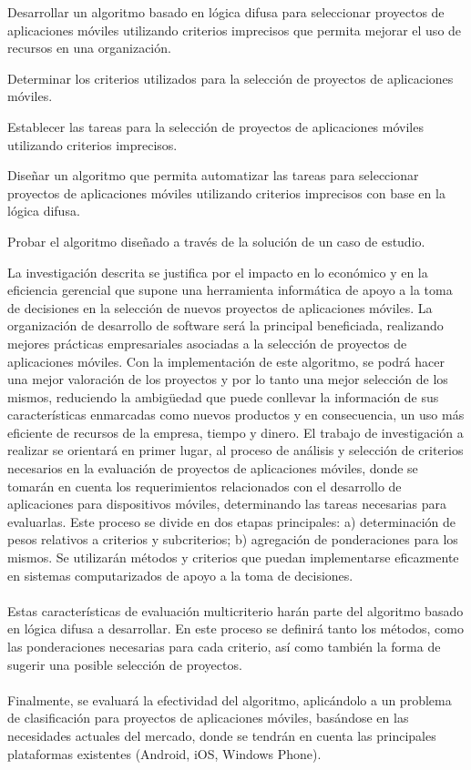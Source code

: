 	Desarrollar un algoritmo basado en lógica difusa para seleccionar proyectos de aplicaciones  móviles utilizando criterios imprecisos que permita mejorar el uso de recursos en una organización.

	\begin{enumeracion}
		\item Determinar los criterios utilizados para la selección de proyectos de aplicaciones  móviles.
		\item Establecer las tareas para la selección de proyectos de aplicaciones móviles utilizando criterios imprecisos. 
		\item Diseñar un algoritmo que permita automatizar las tareas para seleccionar  proyectos de aplicaciones móviles utilizando criterios imprecisos con base en la lógica difusa.
		\item Probar el algoritmo diseñado a través de la solución de un caso de estudio.
	\end{enumeracion}


La investigación descrita se justifica por el impacto en lo económico y en la eficiencia gerencial que supone una herramienta informática de apoyo a la toma de decisiones en la selección de nuevos proyectos de aplicaciones móviles.  La organización de desarrollo de software será la principal beneficiada, realizando mejores prácticas empresariales asociadas a la selección de proyectos de aplicaciones móviles.
Con la implementación de este algoritmo, se podrá hacer una mejor valoración de los proyectos y por lo tanto una mejor selección de los mismos, reduciendo la ambigüedad que puede conllevar la información de sus características enmarcadas como nuevos productos y en consecuencia, un uso más eficiente de recursos de la empresa, tiempo y dinero.
El trabajo de investigación a realizar se orientará en primer lugar, al proceso de análisis y selección de criterios necesarios en la evaluación de proyectos de aplicaciones móviles, donde se tomarán en cuenta los requerimientos relacionados con el desarrollo de aplicaciones para dispositivos móviles, determinando las tareas necesarias para evaluarlas. Este proceso se divide en dos etapas principales: a) determinación de pesos relativos a criterios y subcriterios; b) agregación de ponderaciones para los mismos. Se utilizarán métodos y criterios que puedan implementarse eficazmente en sistemas computarizados de apoyo a la toma de decisiones.\\ 
\\
Estas características de evaluación multicriterio harán parte del algoritmo basado en lógica difusa a desarrollar.  En este proceso se definirá tanto los métodos, como las ponderaciones necesarias para cada criterio, así como también la forma de sugerir una posible selección de proyectos.\\
\\
Finalmente, se evaluará la efectividad del algoritmo, aplicándolo a un problema de clasificación para proyectos de aplicaciones móviles, basándose en las necesidades actuales del mercado, donde se tendrán en cuenta las principales plataformas existentes (Android, iOS, Windows Phone).

